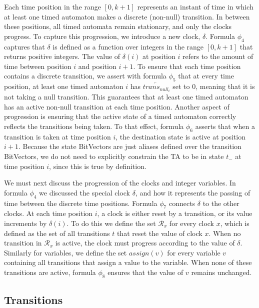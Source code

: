 \documentclass[a4paper,12pt]{article}
\begin{document}
Each time position in the range \([0,k+1]\) represents an instant of time in
which at least one timed automaton makes a discrete (non-null) transition. In
between these positions, all timed automata remain stationary, and only the
clocks progress. To capture this progression, we introduce a new clock,
\(\delta\). Formula \(\phi_4\) captures that \(\delta\) is defined as a function
over integers in the range \([0,k+1]\) that returns positive integers. The value
of \(\delta(i)\) at position \(i\) refers to the amount of time between position
\(i\) and position \(i+1\). To ensure that each time position contains a
discrete transition, we assert with formula \(\phi_5\) that at every time
position, at least one timed automaton \(i\) has
\(\overleftarrow{trans_{null_i}}\) set to 0, meaning that it is not taking a
null transition. This guarantees that at least one timed automaton has an active
non-null transition at each time position. Another aspect of progression is
ensuring that the active state of a timed automaton correctly reflects the
transitions being taken. To that effect, formula \(\phi_6\) asserts that when a
transition is taken at time position \(i\), the destination state is active at
position \(i{+}1\). Because the state BitVectors are just aliases defined over
the transition BitVectors, we do not need to explicitly constrain the TA to be
in state \(t_{-}\) at time position \(i\), since this is true by definition.

We must next discuss the progression of the clocks and integer variables. In
formula \(\phi_4\) we discussed the special clock \(\delta\), and how it
represents the passing of time between the discrete time positions. Formula
\(\phi_7\) connects \(\delta\) to the other clocks. At each time position \(i\),
a clock is either reset by a transition, or its value increments by
\(\delta(i)\). To do this we define the set \(\mathcal{R}_x\) for every clock
\(x\), which is defined as the set of all transitions \(t\) that reset the value
of clock \(x\). When no transition in \(\mathcal{R}_x\) is active, the clock
must progress according to the value of \(\delta\). Similarly for variables, we
define the set \(assign(v)\) for every variable \(v\) containing all transitions
that assign a value to the variable. When none of these transitions are active,
formula \(\phi_8\) ensures that the value of \(v\) remains unchanged.

\subsection{Transitions}\label{consstraints-trans}
\end{document}
